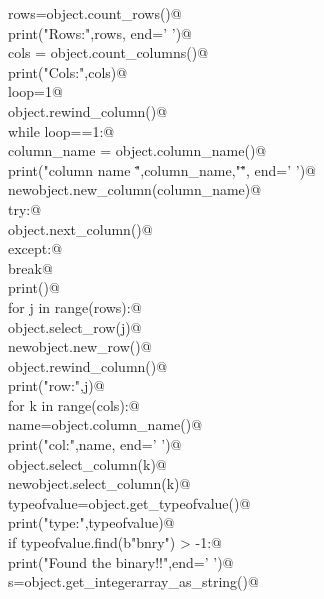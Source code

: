 \documentclass[10pt,a4paper,twoside,notitlepage]{article}
\begin{document}
\begin{flushleft}
\begin{minipage}{\linewidth}
\begin{list}{}{}
\mbox{}\verb@    rows=object.count_rows()@\\
\mbox{}\verb@    print("Rows:",rows, end=' ')@\\
\mbox{}\verb@    cols = object.count_columns()@\\
\mbox{}\verb@    print("Cols:",cols)@\\
\mbox{}\verb@    loop=1@\\
\mbox{}\verb@    object.rewind_column()@\\
\mbox{}\verb@    while loop==1:@\\
\mbox{}\verb@        column_name = object.column_name()@\\
\mbox{}\verb@        print("column name \"",column_name,"\"", end=' ')@\\
\mbox{}\verb@        newobject.new_column(column_name)@\\
\mbox{}\verb@        try:@\\
\mbox{}\verb@           object.next_column()@\\
\mbox{}\verb@        except:@\\
\mbox{}\verb@            break@\\
\mbox{}\verb@    print()@\\
\mbox{}\verb@    for j in range(rows):@\\
\mbox{}\verb@        object.select_row(j)@\\
\mbox{}\verb@        newobject.new_row()@\\
\mbox{}\verb@        object.rewind_column()@\\
\mbox{}\verb@        print("row:",j)@\\
\mbox{}\verb@        for k in range(cols):@\\
\mbox{}\verb@            name=object.column_name()@\\
\mbox{}\verb@            print("col:",name, end=' ')@\\
\mbox{}\verb@            object.select_column(k)@\\
\mbox{}\verb@            newobject.select_column(k)@\\
\mbox{}\verb@            typeofvalue=object.get_typeofvalue()@\\
\mbox{}\verb@            print("type:",typeofvalue)@\\
\mbox{}\verb@            if typeofvalue.find(b"bnry") > -1:@\\
\mbox{}\verb@                print("Found the binary!!",end=' ')@\\
\mbox{}\verb@                s=object.get_integerarray_as_string()@\\

\end{list}
\end{minipage}
\end{flushleft}
\end{document}

